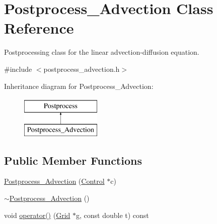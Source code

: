 \hypertarget{class_postprocess___advection}{}\section{Postprocess\+\_\+\+Advection Class Reference}
\label{class_postprocess___advection}


Postprocessing class for the linear advection-\/diffusion equation.  




{\ttfamily \#include $<$postprocess\+\_\+advection.\+h$>$}

Inheritance diagram for Postprocess\+\_\+\+Advection\+:\begin{figure}[H]
\begin{center}
\leavevmode
\includegraphics[height=2.000000cm]{class_postprocess___advection}
\end{center}
\end{figure}
\subsection*{Public Member Functions}
\begin{DoxyCompactItemize}
\item 
\hyperlink{class_postprocess___advection_abb7827dbb36aa66fe09f301fc2c4f385}{Postprocess\+\_\+\+Advection} (\hyperlink{class_control}{Control} $\ast$c)
\item 
\hyperlink{class_postprocess___advection_a734e3dd35af58cd20867d422d28c80fb}{$\sim$\+Postprocess\+\_\+\+Advection} ()
\item 
void \hyperlink{class_postprocess___advection_a7df2f5694b2d345b8e7f19a5de18aa9d}{operator()} (\hyperlink{class_grid}{Grid} $\ast$g, const double t) const 
\end{DoxyCompactItemize}
